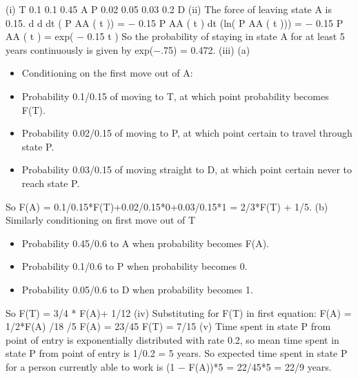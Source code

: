 \documentclass[a4paper,12pt]{article}
\begin{document}
\begin{enumerate}
\newpage
(i)
T
0.1
0.1
0.45
A
P
0.02
0.05
0.03
0.2
D
(ii)
The force of leaving state A is 0.15.
d
d
dt ( P AA ( t )) = − 0.15 P AA ( t )
dt (ln( P AA ( t ))) = − 0.15
P AA ( t ) = exp( − 0.15 t )
So the probability of staying in state A for at least 5 years continuously is given by
exp(−.75) = 0.472.
(iii)
(a)
\begin{itemize}
\item Conditioning on the first move out of A:
\item Probability 0.1/0.15 of moving to T, at which point probability becomes F(T).
\item Probability 0.02/0.15 of moving to P, at which point certain to travel through
state P.
\item Probability 0.03/0.15 of moving straight to D, at which point certain never to
reach state P.
\end{itemize}
So F(A) = 0.1/0.15*F(T)+0.02/0.15*0+0.03/0.15*1 = 2/3*F(T) + 1/5.
(b)
Similarly conditioning on first move out of T
\begin{itemize}
\item Probability 0.45/0.6 to A when probability becomes F(A).
\item Probability 0.1/0.6 to P when probability becomes 0.
\item Probability 0.05/0.6 to D when probability becomes 1.
\end{itemize}

So F(T) = 3/4 * F(A)+ 1/12
(iv)
Substituting for F(T) in first equation:
F(A) = 1/2*F(A) /18 /5
F(A) = 23/45
F(T) = 7/15
(v)
Time spent in state P from point of entry is exponentially distributed
with rate 0.2,
so mean time spent in state P from point of entry is 1/0.2 = 5 years.
So expected time spent in state P for a person currently
able to work is (1 − F(A))*5 = 22/45*5 = 22/9 years.


\end{enumerate}
\end{document}
